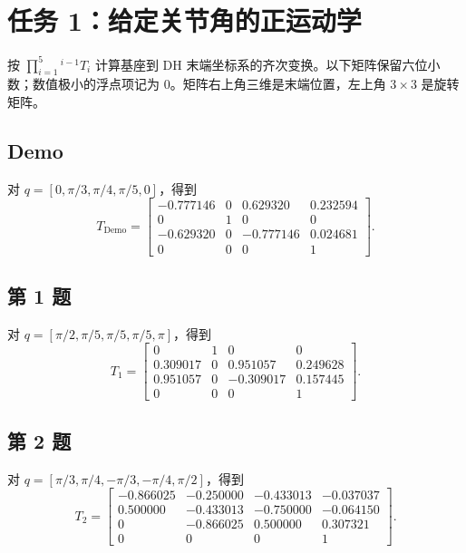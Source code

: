 \documentclass[12pt,a4paper,UTF8]{ctexart}
\begin{document}
\section{任务 1：给定关节角的正运动学}
按 $\prod_{i=1}^{5}{}^{i-1}T_i$ 计算基座到 DH 末端坐标系的齐次变换。以下矩阵保留六位小数；数值极小的浮点项记为 0。矩阵右上角三维是末端位置，左上角 $3\times3$ 是旋转矩阵。

\subsection{Demo}
对 $q=[0,\pi/3,\pi/4,\pi/5,0]$，得到
\begin{equation}
T_{\mathrm{Demo}}=
\begin{bmatrix}
-0.777146&0&0.629320&0.232594\\
0&1&0&0\\
-0.629320&0&-0.777146&0.024681\\
0&0&0&1
\end{bmatrix}.
\end{equation}
\subsection{第 1 题}
对 $q=[\pi/2,\pi/5,\pi/5,\pi/5,\pi]$，得到
\begin{equation}
T_1=
\begin{bmatrix}
0&1&0&0\\
0.309017&0&0.951057&0.249628\\
0.951057&0&-0.309017&0.157445\\
0&0&0&1
\end{bmatrix}.
\end{equation}
\subsection{第 2 题}
对 $q=[\pi/3,\pi/4,-\pi/3,-\pi/4,\pi/2]$，得到
\begin{equation}
T_2=
\begin{bmatrix}
-0.866025&-0.250000&-0.433013&-0.037037\\
0.500000&-0.433013&-0.750000&-0.064150\\
0&-0.866025&0.500000&0.307321\\
0&0&0&1
\end{bmatrix}.
\end{equation}
\end{document}

